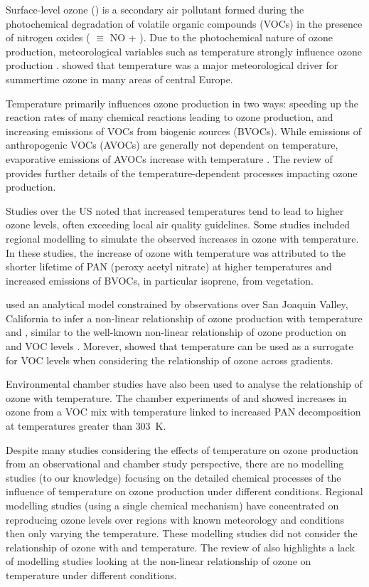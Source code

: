 Surface-level ozone () is a secondary air pollutant formed during the photochemical degradation of volatile organic compounds (VOCs) in the presence of nitrogen oxides ( $\equiv$ NO + ).
Due to the photochemical nature of ozone production, meteorological variables such as temperature strongly influence ozone production \citep{Jacob:2009}.
\citet{Otero:2016} showed that temperature was a major meteorological driver for summertime ozone in many areas of central Europe.

Temperature primarily influences ozone production in two ways: speeding up the reaction rates of many chemical reactions leading to ozone production, and increasing emissions of VOCs from biogenic sources (BVOCs).
While emissions of anthropogenic VOCs (AVOCs) are generally not dependent on temperature, evaporative emissions of AVOCs increase with temperature \citep{Rubin:2006}.
The review of \citet{Pusede:2015} provides further details of the temperature-dependent processes impacting ozone production.

Studies over the US \citep{Sillman:1995a, Dawson:2007, Pusede:2014} noted that increased temperatures tend to lead to higher ozone levels, often exceeding local air quality guidelines.
Some studies \citep{Sillman:1995a, Dawson:2007} included regional modelling to simulate the observed increases in ozone with temperature.
In these studies, the increase of ozone with temperature was attributed to the shorter lifetime of PAN (peroxy acetyl nitrate) at higher temperatures and increased emissions of BVOCs, in particular isoprene, from vegetation.

\citet{Pusede:2014} used an analytical model constrained by observations over San Joaquin Valley, California to infer a non-linear relationship of ozone production with temperature and , similar to the well-known non-linear relationship of ozone production on  and VOC levels \citep{Sillman:1999}.
Morever, \citet{Pusede:2014} showed that temperature can be used as a surrogate for VOC levels when considering the relationship of ozone across  gradients.

Environmental chamber studies have also been used to analyse the relationship of ozone with temperature.
The chamber experiments of \citet{Carter:1979} and \citet{Hatakeyama:1991} showed increases in ozone from a VOC mix with temperature linked to increased PAN decomposition at temperatures greater than $303$~K.

Despite many studies considering the effects of temperature on ozone production from an observational and chamber study perspective, there are no modelling studies (to our knowledge) focusing on the detailed chemical processes of the influence of temperature on ozone production under different  conditions.
Regional modelling studies (using a single chemical mechanism) have concentrated on reproducing ozone levels over regions with known meteorology and  conditions then only varying the temperature.
These modelling studies did not consider the relationship of ozone with  and temperature.
The review of \citet{Pusede:2015} also highlights a lack of modelling studies looking at the non-linear relationship of ozone on temperature under different  conditions.

